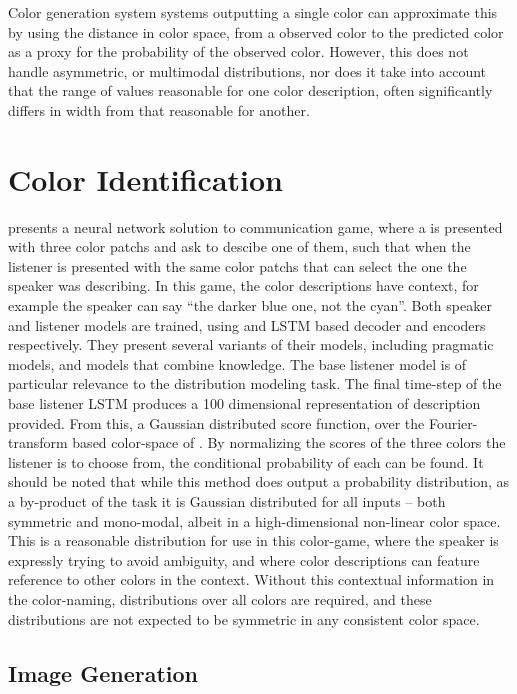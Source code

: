 \documentclass[11pt,letterpaper]{article}
\begin{document}
Color generation system systems outputting a single color can approximate this by using the distance in color space, from a observed color to the predicted color as a proxy for the probability of the observed color. However, this does not handle asymmetric, or multimodal distributions, nor does it take into account that the range of values reasonable for one color description, often significantly differs in width from that reasonable for another.

\section{Color Identification}

\cite{DBLP:journals/corr/MonroeHGP17} presents a neural network solution to communication game, where a is presented with three color patchs and ask to descibe one of them, 
such that when the listener is presented with the same color patchs that can select the one the speaker was describing.
In this game, the color descriptions have context, for example the speaker can say ``the darker blue one, not the cyan''.
Both speaker and listener models are trained, using and LSTM based decoder and encoders respectively.
They present several variants of their models, including pragmatic models, and models that combine knowledge.
The base listener model is of particular relevance to the distribution modeling task.
The final time-step of the base listener LSTM produces a 100 dimensional representation of description provided.
From this, a Gaussian distributed score function, over the Fourier-transform based color-space of \cite{2016arXiv160603821M}.
By normalizing the scores of the three colors the listener is to choose from, the conditional probability of each can be found.
It should be noted that while this method does output a probability distribution, as a by-product of the task
it is Gaussian distributed for all inputs -- both symmetric and mono-modal, albeit in a high-dimensional non-linear color space.
This is a reasonable distribution for use in this color-game, where the speaker is expressly trying to avoid ambiguity,
and where color descriptions can feature reference to other colors in the context.
Without this contextual information in the color-naming, distributions over all colors are required,
and these distributions are not expected to be symmetric in any consistent color space.

\subsection{Image Generation}
\end{document}
